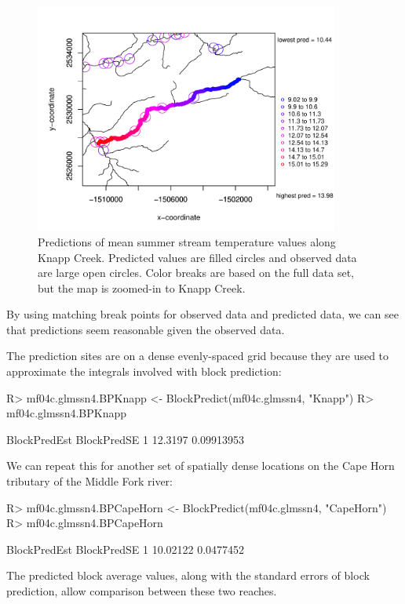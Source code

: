 \documentclass[nojss]{jss}
\renewenvironment{Schunk}{\vspace{\topsep}}{\vspace{\topsep}}
\begin{document}
\begin{figure}[htbp]
  \begin{center}
    \includegraphics[keepaspectratio=true, width = 100mm]{Figures/jss984Fig-Preds2}
    \caption{Predictions of mean summer stream temperature values
      along Knapp Creek. Predicted values are filled circles
      and observed data are large open circles. Color breaks are based
      on the full data set, but the map is zoomed-in to Knapp Creek. \label{Preds2}}
  \end{center}
\end{figure}
By using matching break points for observed data and predicted data,
we can see that predictions seem reasonable given the observed data.

The prediction sites are on a dense evenly-spaced grid because they
are used to approximate the integrals involved with block prediction:
\begin{Schunk}
\begin{Sinput}
R> mf04c.glmssn4.BPKnapp <- BlockPredict(mf04c.glmssn4, "Knapp")
R> mf04c.glmssn4.BPKnapp
\end{Sinput}
\begin{Soutput}
  BlockPredEst BlockPredSE
1      12.3197  0.09913953
\end{Soutput}
\end{Schunk}
We can repeat this for another set of spatially dense locations on the
Cape Horn tributary of the Middle Fork river:
\begin{Schunk}
\begin{Sinput}
R> mf04c.glmssn4.BPCapeHorn <- BlockPredict(mf04c.glmssn4, "CapeHorn")
R> mf04c.glmssn4.BPCapeHorn
\end{Sinput}
\begin{Soutput}
  BlockPredEst BlockPredSE
1     10.02122   0.0477452
\end{Soutput}
\end{Schunk}
The predicted block average values, along with the standard errors of
block prediction, allow comparison between these two reaches.
\end{document}
